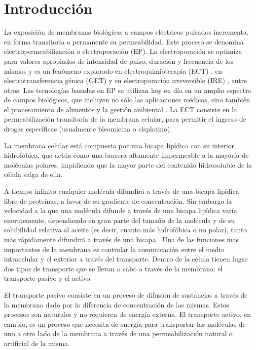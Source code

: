 \chapter{Introducción}

La exposición de membranas biológicas a campos eléctricos pulsados incrementa, en forma transitoria o permanente su permeabilidad. Este proceso se denomina electropermeabilización o electroporación (EP). La electroporación se optimiza para valores apropiados de intensidad de pulso, duración y frecuencia de los mismos \cite{c3, c4-marino} y es un fenómeno explorado en electroquimioterapia (ECT) \cite{c1pl, c2pl, c3pl}, en electrotransferencia génica (GET) \cite{c4pl, c5pl, c6pl} y en electroporación irreversible (IRE) \cite{c7pl}, entre otros. Las tecnologías basadas en EP se utilizan hoy en día en un amplio espectro de campos biológicos, que incluyen no sólo las aplicaciones médicas, sino también el procesamiento de alimentos y la gestión ambiental \cite{c9pl, c10pl, c11pl}. La ECT consiste en la permeabilización transitoria de la membrana celular, para permitir el ingreso de drogas específicas (usualmente bleomicina o cisplatino).

La membrana celular está compuesta por una bicapa lipídica con su interior hidrofóbico, que actúa como una barrera altamente impermeable a la mayoría de moléculas polares, impidiendo que la mayor parte del contenido hidrosoluble de la célula salga de ella. 

A tiempo infinito  cualquier molécula difundirá a través de una bicapa lipídica libre de proteínas, a favor de su gradiente de concentración. Sin embargo la velocidad a la que una molécula difunde a través de una bicapa lipídica varía enormemente, dependiendo en gran parte del tamaño de la molécula y de su solubilidad relativa al aceite (es decir, cuanto más hidrofóbica o no polar), tanto más rápidamente difundirá a través de una bicapa \cite[p.~470-471]{c12}. Una de las funciones mas importantes de la membrana es controlar la comunicación entre el medio intracelular y el exterior a través del transporte. Dentro de la célula tienen lugar dos tipos de transporte que se llevan a cabo a través de la membrana: el transporte pasivo y el activo. 

El transporte pasivo consiste en un proceso de difusión de sustancias a través de la membrana dado por la diferencia de concentración de las mismas. Estos procesos son naturales y no requieren de energía externa. El transporte activo, en cambio, es un proceso que necesita de energía para transportar las moléculas de uno a otro lado de la membrana a través de una permeabilización natural o artificial de la misma.

